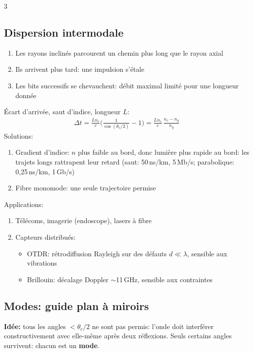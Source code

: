 \documentclass[12pt, a4paper]{article}
\begin{document}
\begin{multicols*}{3}
	\subsection{Dispersion intermodale}
	\begin{enumerate}[\roman*.]
		\item Les rayons inclinés parcourent un chemin plus long que le rayon axial
		\item Ils arrivent plus tard: une impulsion s'étale
		\item Les bits successifs se chevauchent: débit maximal limité pour une longueur donnée
	\end{enumerate}
	Écart d'arrivée, saut d'indice, longueur $L$:
	\begin{gather*}
		\Delta t=\frac{Ln_c}{c}\Big(\frac{1}{\cos(\theta_c/2)}-1\Big)=\frac{Ln_c}{c}\,\frac{n_c-n_g}{n_g}
	\end{gather*}
	Solutions:
	\begin{enumerate}[\roman*.]
		\item Gradient d'indice: $n$ plus faible au bord, donc lumière plus rapide au bord: les trajets longs rattrapent leur retard (saut: 50\,ns/km, 5\,Mb/s; parabolique: 0,25\,ns/km, 1\,Gb/s)
		\item Fibre monomode: une seule trajectoire permise
	\end{enumerate}

	Applications:
	\begin{enumerate}[\roman*.]
		\item Télécoms, imagerie (endoscope), lasers à fibre
		\item Capteurs distribués:
		      \begin{itemize}
			      \item OTDR: rétrodiffusion Rayleigh sur des défauts $d\ll\lambda$, sensible aux vibrations
			      \item Brillouin: décalage Doppler $\sim$11\,GHz, sensible aux contraintes
		      \end{itemize}
	\end{enumerate}

	\subsection{Modes: guide plan à miroirs}
	\textbf{Idée:} tous les angles $<\theta_c/2$ ne sont pas permis: l'onde doit interférer constructivement avec elle-même après deux réflexions. Seuls certains angles survivent: chacun est un \textbf{mode}.


\end{multicols*}
\end{document}
